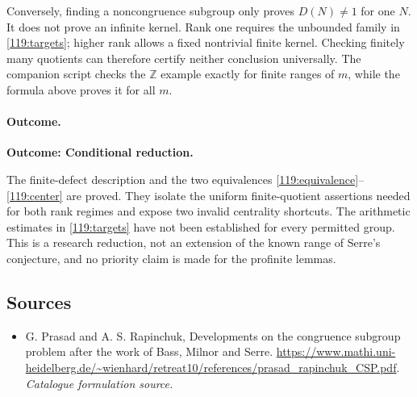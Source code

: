\documentclass[11pt,a4paper]{article}
\newcommand{\Z}{\mathbb{Z}}
\numberwithin{equation}{section}
\begin{document}
Conversely, finding a noncongruence subgroup only proves $D(N)\ne1$ for
one $N$.  It does not prove an infinite kernel.  Rank one requires the
unbounded family in \eqref{119:targets}; higher rank allows a fixed
nontrivial finite kernel.  Checking finitely many quotients can therefore
certify neither conclusion universally.  The companion script checks
the $\Z$ example exactly for finite ranges of $m$, while the formula
above proves it for all $m$.

\paragraph{Outcome.}
\textbf{Outcome: Conditional reduction.}

The finite-defect description and the two equivalences
\eqref{119:equivalence}--\eqref{119:center} are proved.  They isolate the
uniform finite-quotient assertions needed for both rank regimes and expose
two invalid centrality shortcuts.  The arithmetic estimates in
\eqref{119:targets} have not been established for every permitted group.
This is a research reduction, not an extension of the known range of
Serre's conjecture, and no priority claim is made for the profinite lemmas.
\subsection{Sources}
\begin{itemize}\raggedright
\item[\textnormal{[S1]}]\hypertarget{source:119:1}{} G. Prasad and A. S. Rapinchuk, Developments on the congruence subgroup problem after the work of Bass, Milnor and Serre.
\url{https://www.mathi.uni-heidelberg.de/~wienhard/retreat10/references/prasad_rapinchuk_CSP.pdf}.
{\small\textit{Catalogue formulation source.}}
\end{itemize}
\end{document}
